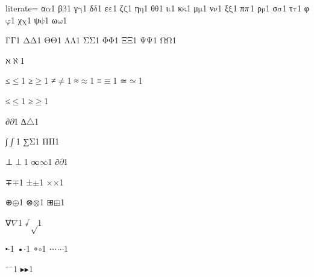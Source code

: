 {%
literate=
{α}{{\ensuremath{\mathrm{\alpha}}}}1
{β}{{\ensuremath{\mathrm{\beta}}}}1
{γ}{{\ensuremath{\mathrm{\gamma}}}}1
{δ}{{\ensuremath{\mathrm{\delta}}}}1
{ε}{{\ensuremath{\mathrm{\varepsilon}}}}1
{ζ}{{\ensuremath{\mathrm{\zeta}}}}1
{η}{{\ensuremath{\mathrm{\eta}}}}1
{θ}{{\ensuremath{\mathrm{\theta}}}}1
{ι}{{\ensuremath{\mathrm{\iota}}}}1
{κ}{{\ensuremath{\mathrm{\kappa}}}}1
{μ}{{\ensuremath{\mathrm{\mu}}}}1
{ν}{{\ensuremath{\mathrm{\nu}}}}1
{ξ}{{\ensuremath{\mathrm{\xi}}}}1
{π}{{\ensuremath{\mathrm{\mathnormal{\pi}}}}}1
{ρ}{{\ensuremath{\mathrm{\rho}}}}1
{σ}{{\ensuremath{\mathrm{\sigma}}}}1
{τ}{{\ensuremath{\mathrm{\tau}}}}1
{φ}{{\ensuremath{\mathrm{\varphi}}}}1
{χ}{{\ensuremath{\mathrm{\chi}}}}1
{ψ}{{\ensuremath{\mathrm{\psi}}}}1
{ω}{{\ensuremath{\mathrm{\omega}}}}1

{Γ}{{\ensuremath{\mathrm{\Gamma}}}}1
{Δ}{{\ensuremath{\mathrm{\Delta}}}}1
{Θ}{{\ensuremath{\mathrm{\Theta}}}}1
{Λ}{{\ensuremath{\mathrm{\Lambda}}}}1
{Σ}{{\ensuremath{\mathrm{\Sigma}}}}1
{Φ}{{\ensuremath{\mathrm{\Phi}}}}1
{Ξ}{{\ensuremath{\mathrm{\Xi}}}}1
{Ψ}{{\ensuremath{\mathrm{\Psi}}}}1
{Ω}{{\ensuremath{\mathrm{\Omega}}}}1

{ℵ}{{\ensuremath{\aleph}}}1

{≤}{{\ensuremath{\leq}}}1
{≥}{{\ensuremath{\geq}}}1
{≠}{{\ensuremath{\neq}}}1
{≈}{{\ensuremath{\approx}}}1
{≡}{{\ensuremath{\equiv}}}1
{≃}{{\ensuremath{\simeq}}}1

{≤}{{\ensuremath{\leq}}}1
{≥}{{\ensuremath{\geq}}}1

{∂}{{\ensuremath{\partial}}}1
{∆}{{\ensuremath{\triangle}}}1 %

{∫}{{\ensuremath{\int}}}1
{∑}{{\ensuremath{\mathrm{\Sigma}}}}1
{Π}{{\ensuremath{\mathrm{\Pi}}}}1

{⊥}{{\ensuremath{\perp}}}1
{∞}{{\ensuremath{\infty}}}1
{∂}{{\ensuremath{\partial}}}1

{∓}{{\ensuremath{\mp}}}1
{±}{{\ensuremath{\pm}}}1
{×}{{\ensuremath{\times}}}1

{⊕}{{\ensuremath{\oplus}}}1
{⊗}{{\ensuremath{\otimes}}}1
{⊞}{{\ensuremath{\boxplus}}}1

{∇}{{\ensuremath{\nabla}}}1
{√}{{\ensuremath{\sqrt}}}1

{⬝}{{\ensuremath{\cdot}}}1
{•}{{\ensuremath{\cdot}}}1
{∘}{{\ensuremath{\circ}}}1
{⋯}{{\ensuremath{\cdots}}}1

{⁻}{{\ensuremath{^{-}}}}1
{▸}{{\ensuremath{\blacktriangleright}}}1

}
